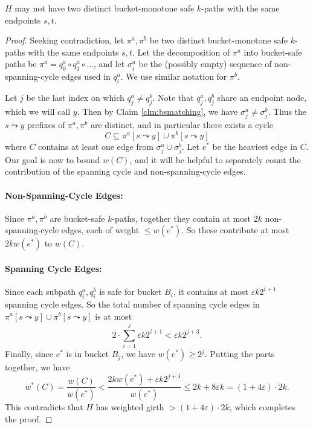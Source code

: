\documentclass{article}\usepackage[a4paper,margin=20mm]{geometry}
\newcommand{\eps}{\varepsilon}
\begin{document}
\begin{lemma}  \label{lem:fulldisp}
$H$ may not have two distinct bucket-monotone safe $k$-paths with the same endpoints $s, t$.
\end{lemma}
\begin{proof}
Seeking contradiction, let $\pi^a, \pi^b$ be two distinct bucket-monotone safe $k$-paths with the same endpoints $s, t$.
Let the decomposition of $\pi^a$ into bucket-safe paths be
$\pi^a = q^a_0 \circ q^a_1 \circ \dots$, and let $\sigma^a_i$ be the (possibly empty) sequence of non-spanning-cycle edges used in $q^a_i$.
We use similar notation for $\pi^b$.

Let $j$ be the last index on which $q^a_j \ne q^b_j$.
Note that $q^a_{j}, q^b_{j}$ share an endpoint node, which we will call $y$.
Then by Claim \ref{clm:bsmatching}, we have $\sigma^a_{j} \ne \sigma^b_{j}$.
Thus the $s \leadsto y$ prefixes of $\pi^a, \pi^b$ are distinct, and in particular there exists a cycle
$$C \subseteq \pi^a[s \leadsto y] \cup \pi^b[s\leadsto y]$$
where $C$ contains at least one edge from $\sigma^a_{j} \cup \sigma^b_{j}$.
Let $e^*$ be the heaviest edge in $C$.
Our goal is now to bound $w(C)$, and it will be helpful to separately count the contribution of the spanning cycle and non-spanning-cycle edges.

\paragraph{Non-Spanning-Cycle Edges:} Since $\pi^a, \pi^b$ are bucket-safe $k$-paths, together they contain at most $2k$ non-spanning-cycle edges, each of weight $\le w(e^*)$.
So these contribute at most $2k w(e^*)$ to $w(C)$.

\paragraph{Spanning Cycle Edges:} Since each subpath $q^a_i, q^b_i$ is safe for bucket $B_i$, it contains at most $\eps k 2^{i+1}$ spanning cycle edges.
So the total number of spanning cycle edges in $\pi^a[s\leadsto y] \cup \pi^b[s\leadsto y]$ is at most
$$2 \cdot \sum \limits_{i=1}^j \eps k 2^{i+1} < \eps k 2^{j+3}.$$
Finally, since $e^*$ is in bucket $B_j$, we have $w(e^*) \ge 2^j$.
Putting the parts together, we have
$$w^*(C) = \frac{w(C)}{w(e^*)} < \frac{2k w(e^*) + \eps k 2^{j+3}}{w(e^*)} \le 2k + 8 \eps k = (1+4\eps) \cdot 2k.$$
This contradicts that $H$ has weighted girth $> (1+4\eps) \cdot 2k$, which completes the proof.
\end{proof}
\end{document}
